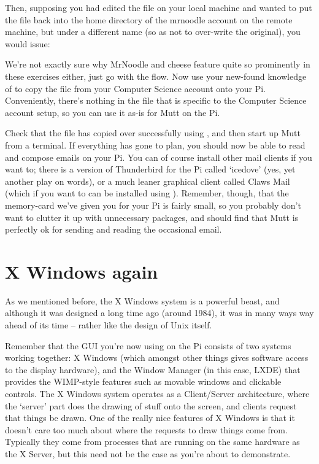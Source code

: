 Then, supposing you had edited the file  on your local machine and wanted to put the file back into the home directory of the mrnoodle account on the remote machine, but under a different name (so as not to over-write the original), you would issue:


We're not exactly sure why MrNoodle and cheese feature quite so prominently in these exercises either, just go with the flow. Now use your new-found knowledge of  to copy the  file from your Computer Science account onto your Pi. Conveniently, there's nothing in the  file that is specific to the Computer Science account setup, so you can use it as-is for Mutt on the Pi. 

Check that the file has copied over successfully using , and then start up Mutt from a terminal. If everything has gone to plan, you should now be able to read and compose emails on your Pi. You can of course install other mail clients if you want to; there is a version of Thunderbird for the Pi called `icedove' (yes, yet another play on words), or a much leaner graphical client called Claws Mail (which if you want to can be installed using ). Remember, though, that the memory-card we've given you for your Pi is fairly small, so you probably don't want to clutter it up with unnecessary packages, and should find that Mutt is perfectly ok for sending and reading the occasional email. 

\section{X Windows again}

As we mentioned before, the X Windows system is a powerful beast, and although it was designed a long time ago (around 1984), it was in many ways way ahead of its time -- rather like the design of Unix itself.

Remember that the GUI you're now using on the Pi consists of two systems working together: X Windows (which amongst other things gives software access to the display hardware), and the Window Manager (in this case, LXDE) that provides the WIMP-style features such as movable windows and clickable controls. The X Windows system operates as a Client/Server architecture, where the `server' part does the drawing of stuff onto the screen, and clients request that things be drawn. One of the really nice features of X Windows is that it doesn't care too much about where the requests to draw things come from. Typically they come from processes that are running on the same hardware as the X Server, but this need not be the case as you're about to demonstrate.

